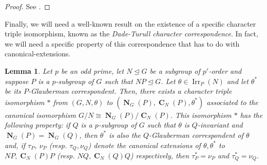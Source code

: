 \documentclass[12pt]{amsart}
\DeclareMathOperator{\CB}{\mathbf{C}}
\DeclareMathOperator{\NB}{\mathbf{N}}
\DeclareMathOperator{\Irr}{Irr}
\theoremstyle{remark}
\theoremstyle{definition}
\theoremstyle{plain}
\newtheorem{lem}[thm]{Lemma}
\theoremstyle{definition}
\numberwithin{equation}{section}
\begin{document}
\begin{proof}
	See \cite[Lemma 2.1]{PickyPSolvable}.
\end{proof}

Finally, we will need a well-known result on the existence of a specific character triple isomorphism, known as the \emph{Dade-Turull character correspondence}. In fact, we will need a specific property of this correspondence that has to do with canonical-extensions.

\begin{lem}
	\label{TurullLemma}
	Let $p$ be an odd prime, let $N \unlhd G$ be a subgroup of $p'$-order and suppose $P$ is a $p$-subgroup of $G$ such that $NP \unlhd G$. Let $\theta \in \Irr_P(N)$ and let $\theta^*$ be its $P$-Glauberman correspondent. Then, there exists a character triple isomorphism $*$ from $(G, N, \theta)$ to $(\NB_G(P), \CB_N(P), \theta^*)$ associated to the canonical isomorphism $G/N \cong \NB_G(P)/\CB_N(P)$. This isomorphism $*$ has the following property: if $Q$ is a $p$-subgroup of $G$ such that $\theta$ is $Q$-invariant and $\NB_G(P) = \NB_G(Q)$, then $\theta^*$ is also the $Q$-Glauberman correspondent of $\theta$ and, if $\tau_P$, $\nu_P$ (resp. $\tau_Q, \nu_Q$) denote the canonical extensions of $\theta, \theta^*$ to $NP, \CB_N(P)P$ (resp. $NQ, \CB_N(Q)Q$) respectively, then $\tau_P^* = \nu_P$ and $\tau_Q^* = \nu_Q$.
\end{lem}
\end{document}
